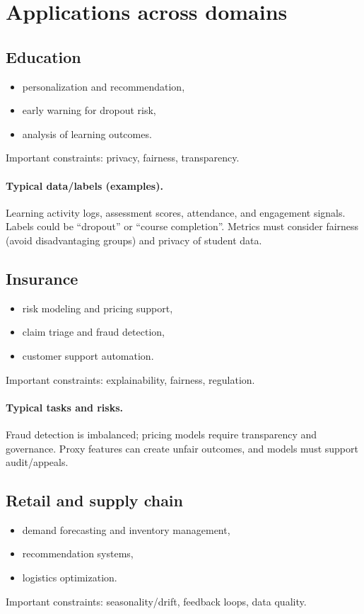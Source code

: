 \documentclass[11pt]{article}
\begin{document}
\section{Applications across domains}
\subsection{Education}
\begin{itemize}[leftmargin=*]
  \item personalization and recommendation,
  \item early warning for dropout risk,
  \item analysis of learning outcomes.
\end{itemize}
Important constraints: privacy, fairness, transparency.

\paragraph{Typical data/labels (examples).}
Learning activity logs, assessment scores, attendance, and engagement signals.
Labels could be ``dropout'' or ``course completion''.
Metrics must consider fairness (avoid disadvantaging groups) and privacy of student data.

\subsection{Insurance}
\begin{itemize}[leftmargin=*]
  \item risk modeling and pricing support,
  \item claim triage and fraud detection,
  \item customer support automation.
\end{itemize}
Important constraints: explainability, fairness, regulation.

\paragraph{Typical tasks and risks.}
Fraud detection is imbalanced; pricing models require transparency and governance.
Proxy features can create unfair outcomes, and models must support audit/appeals.

\subsection{Retail and supply chain}
\begin{itemize}[leftmargin=*]
  \item demand forecasting and inventory management,
  \item recommendation systems,
  \item logistics optimization.
\end{itemize}
Important constraints: seasonality/drift, feedback loops, data quality.
\end{document}
